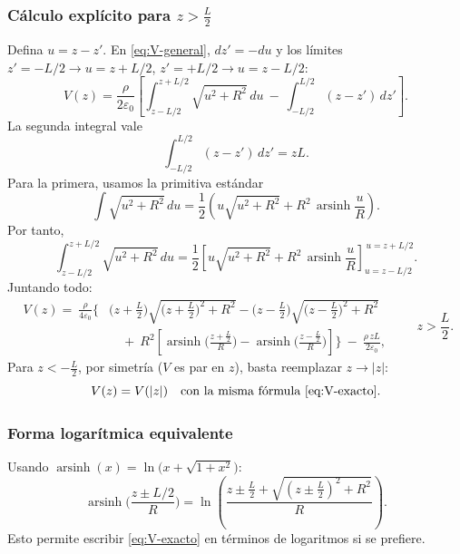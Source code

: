 \documentclass{article}
\begin{document}
\subsubsection*{Cálculo explícito para $z>\tfrac{L}{2}$}
Defina $u=z-z'$. En \eqref{eq:V-general}, $dz'=-du$ y los límites $z'=-L/2\to u=z+L/2$, $z'=+L/2\to u=z-L/2$:
\[
V(z)=\frac{\rho}{2\varepsilon_0}\left[
\int_{z-L/2}^{z+L/2}\!\!\sqrt{u^2+R^2}\,du\ -\ \int_{-L/2}^{L/2}\!(z-z')\,dz' \right].
\]
La segunda integral vale
\[
\int_{-L/2}^{L/2}(z-z')\,dz' = zL.
\]
Para la primera, usamos la primitiva estándar
\[
\int \sqrt{u^2+R^2}\,du=\frac{1}{2}\left(u\sqrt{u^2+R^2}+R^2\,\operatorname{arsinh}\!\frac{u}{R}\right).
\]
Por tanto,
\[
\int_{z-L/2}^{z+L/2}\!\!\sqrt{u^2+R^2}\,du
=\frac{1}{2}\left[
u\sqrt{u^2+R^2}+R^2\,\operatorname{arsinh}\!\frac{u}{R}
\right]_{u=z-L/2}^{\,u=z+L/2}.
\]
Juntando todo:
\begin{equation}\label{eq:V-exacto}
\boxed{
\begin{aligned}
V(z)=\ \frac{\rho}{4\varepsilon_0}\Bigg\{&
\big(z+\tfrac{L}{2}\big)\sqrt{\big(z+\tfrac{L}{2}\big)^2+R^2}
-\big(z-\tfrac{L}{2}\big)\sqrt{\big(z-\tfrac{L}{2}\big)^2+R^2}\\[4pt]
&\quad +\ R^2\left[
\operatorname{arsinh}\!\Big(\frac{z+\tfrac{L}{2}}{R}\Big)
-\operatorname{arsinh}\!\Big(\frac{z-\tfrac{L}{2}}{R}\Big)
\right]
\Bigg\}\ -\ \frac{\rho\,zL}{2\varepsilon_0},
\end{aligned}}
\qquad z>\frac{L}{2}.
\end{equation}
Para $z<-\tfrac{L}{2}$, por simetría ($V$ es par en $z$), basta reemplazar $z\to|z|$:
\[
V(z)=V(|z|)\quad\text{con la misma fórmula } \eqref{eq:V-exacto}.
\]

\subsubsection*{Forma logarítmica equivalente}
Usando $\operatorname{arsinh}(x)=\ln\!\big(x+\sqrt{1+x^2}\big)$:
\[
\operatorname{arsinh}\!\Big(\frac{z\pm L/2}{R}\Big)
=\ln\!\left(\frac{z\pm \tfrac{L}{2}+\sqrt{(z\pm \tfrac{L}{2})^2+R^2}}{R}\right).
\]
Esto permite escribir \eqref{eq:V-exacto} en términos de logaritmos si se prefiere.
\end{document}
